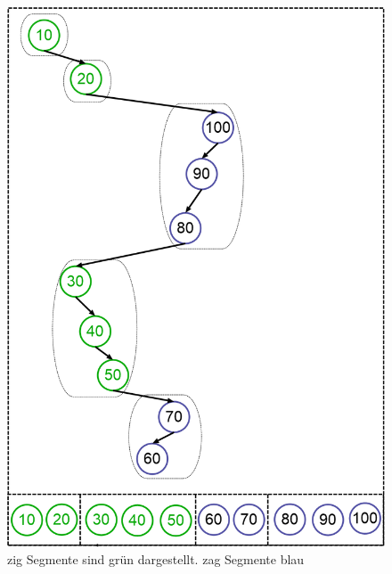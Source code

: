 \documentclass[a4paper,12pt]{article}
\begin{document}
 
\begin{figure}[h]
	\centering
	\includegraphics[height= 0.7\textwidth]{"Medien/Zipper/preferredPathZigZag"}
	\caption{zig Segmente sind grün dargestellt. zag Segmente blau }
	\label{fig:preferredPathZigZag}
\end{figure}
\newpage


\end{document}
